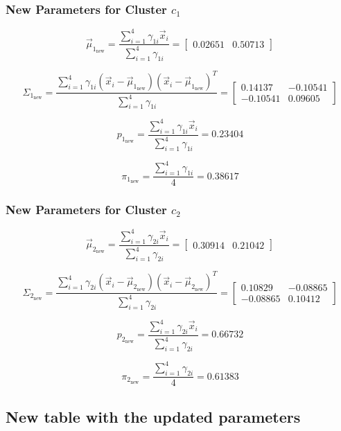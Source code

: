 \documentclass{article}
\begin{document}
\subsubsection*{New Parameters for Cluster $c_1$}

\[ \vec{\mu}_{1_{\text{new}}} = \frac{\sum_{i=1}^4 \gamma_{1i} \vec{x}_i}{\sum_{i=1}^4 \gamma_{1i}} = \begin{bmatrix} 0.02651 & 0.50713  \end{bmatrix} \]

\[ \Sigma_{1_{\text{new}}} = \frac{\sum_{i=1}^4 \gamma_{1i} \left(\vec{x}_i - \vec{\mu}_{1_{\text{new}}} \right) \left( \vec{x}_i - \vec{\mu}_{1_{\text{new}}}\right)^T}{\sum_{i=1}^4 \gamma_{1i}} = \begin{bmatrix}  0.14137 & -0.10541 \\  -0.10541 &  0.09605  \end{bmatrix} \]

\[ p_{1_{\text{new}}} = \frac{\sum_{i=1}^4 \gamma_{1i} \vec{x}_i}{\sum_{i=1}^4 \gamma_{1i}} = 0.23404 \]

\[ \pi_{1_{\text{new}}} = \frac{\sum_{i=1}^4 \gamma_{1i}}{4} = 0.38617 \]

\subsubsection*{New Parameters for Cluster $c_2$}

\[ \vec{\mu}_{2_{\text{new}}} = \frac{\sum_{i=1}^4 \gamma_{2i} \vec{x}_i}{\sum_{i=1}^4 \gamma_{2i}} = \begin{bmatrix} 0.30914 & 0.21042  \end{bmatrix} \]

\[ \Sigma_{2_{\text{new}}} = \frac{\sum_{i=1}^4 \gamma_{2i} \left(\vec{x}_i - \vec{\mu}_{2_{\text{new}}} \right) \left( \vec{x}_i - \vec{\mu}_{2_{\text{new}}}\right)^T}{\sum_{i=1}^4 \gamma_{2i}} = \begin{bmatrix}  0.10829 & -0.08865 \\  -0.08865 &  0.10412  \end{bmatrix} \]

\[ p_{2_{\text{new}}} = \frac{\sum_{i=1}^4 \gamma_{2i} \vec{x}_i}{\sum_{i=1}^4 \gamma_{2i}} = 0.66732 \]

\[ \pi_{2_{\text{new}}} = \frac{\sum_{i=1}^4 \gamma_{2i}}{4} = 0.61383 \]

\subsection*{New table with the updated parameters}
\end{document}
